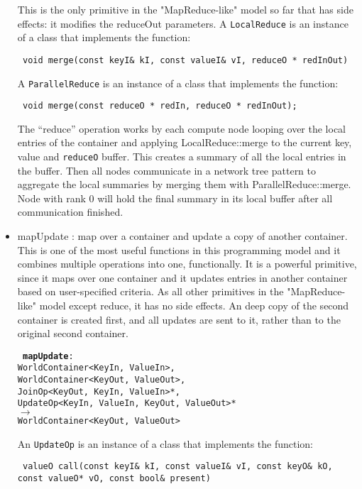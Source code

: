 \documentclass{article}
\begin{document}
\begin{itemize}
     This is the only primitive in the "MapReduce-like" model so far
     that has side effects: it modifies the reduceOut parameters.
     A {\tt LocalReduce} is an instance of a class that implements the function:

     {\tt
     void merge(const keyI\& kI, const valueI\& vI, reduceO * redInOut)
     }

     A {\tt ParallelReduce} is an instance of a class that implements the function:

     {\tt
     void merge(const reduceO * redIn, reduceO * redInOut);
     } 

     The ``reduce'' operation works by each compute node 
     looping over the local entries of the container and applying
     LocalReduce::merge to the current key, value and {\tt reduceO}
     buffer. This creates a summary of all the local entries in
     the buffer. Then all nodes communicate in a network tree pattern to
     aggregate the local summaries by merging them with ParallelReduce::merge.
     Node with rank 0 will hold the final summary in its local buffer after all communication finished.

  \item mapUpdate : map over a container and update a copy of another container.
    This is one of the most useful functions in this programming model and it
combines multiple operations into one, functionally.  It is a powerful
primitive, since it maps over one container and it updates entries in another
container based on user-specified criteria.  As all other primitives in the
"MapReduce-like" model except reduce, it has no side effects.  An deep copy of the second
container is created first, and all updates are sent to it, rather than to
the original second container.

    {\tt
    {\bf mapUpdate}:\\ 
    WorldContainer<KeyIn, ValueIn>,\\ 
    WorldContainer<KeyOut, ValueOut>,\\ 
    JoinOp<KeyOut, KeyIn, ValueIn>*,\\ 
    UpdateOp<KeyIn, ValueIn, KeyOut, ValueOut>*\\
    $\rightarrow$\\
    WorldContainer<KeyOut, ValueOut>\\      
    }

    An {\tt UpdateOp} is an instance of a class that implements the function:

    {\tt
    valueO call(const keyI\& kI, const valueI\& vI, const keyO\& kO, const valueO* vO, const bool\& present)
    }


\end{itemize}
\end{document}
